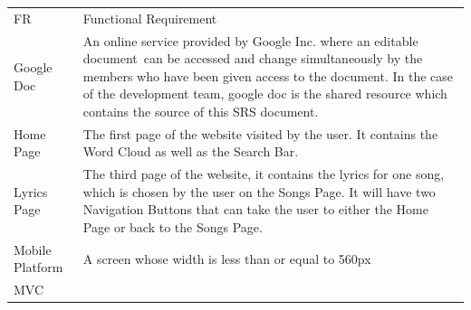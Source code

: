 \documentclass[]{article}
\begin{document}
\begin{longtable}[c]{@{}ll@{}}
\begin{minipage}[t]{0.47\columnwidth}\raggedright
FR
\end{minipage} & \begin{minipage}[t]{0.47\columnwidth}\raggedright
Functional Requirement
\end{minipage}
\\\addlinespace
\begin{minipage}[t]{0.47\columnwidth}\raggedright
Google Doc
\end{minipage} & \begin{minipage}[t]{0.47\columnwidth}\raggedright
An online service provided by Google Inc. where an editable document~can
be accessed and change simultaneously by the members who have been given
access to the document. In the case of the development team, google doc
is the shared resource which contains the source of this SRS document.
\end{minipage}
\\\addlinespace
\begin{minipage}[t]{0.47\columnwidth}\raggedright
Home Page
\end{minipage} & \begin{minipage}[t]{0.47\columnwidth}\raggedright
The first page of the website visited by the user. It contains the Word
Cloud as well as the Search Bar.
\end{minipage}
\\\addlinespace
\begin{minipage}[t]{0.47\columnwidth}\raggedright
Lyrics Page
\end{minipage} & \begin{minipage}[t]{0.47\columnwidth}\raggedright
The third page of the website, it contains the lyrics for one song,
which is chosen by the user on the Songs Page. It will have two
Navigation Buttons that can take the user to either the Home Page or
back to the Songs Page.
\end{minipage}
\\\addlinespace
\begin{minipage}[t]{0.47\columnwidth}\raggedright
Mobile Platform
\end{minipage} & \begin{minipage}[t]{0.47\columnwidth}\raggedright
A screen whose width is less than or equal to 560px
\end{minipage}
\\\addlinespace
\begin{minipage}[t]{0.47\columnwidth}\raggedright
MVC
\end{minipage} & \begin{minipage}[t]{0.47\columnwidth}\raggedright

\end{minipage}
\end{longtable}
\end{document}
